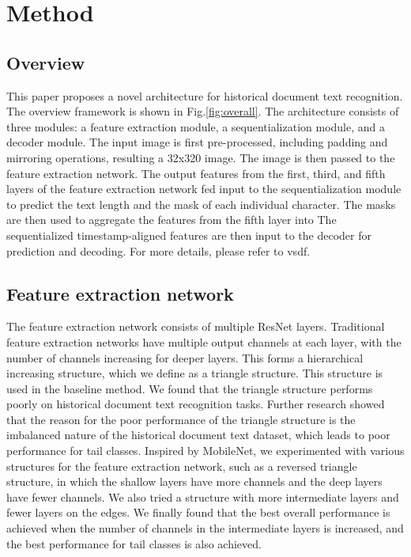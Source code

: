 \section{Method}

\subsection{Overview}
 

This paper proposes a novel architecture for historical document text recognition. The overview framework is shown in Fig.\ref{fig:overall}. The architecture consists of three modules: a feature extraction module, a sequentialization module, and a decoder module. The input image is first pre-processed, including padding and mirroring operations, resulting a 32x320 image. 
The image is then passed to the feature extraction network. The output features from the first, third, and fifth layers of the feature extraction network fed input to the sequentialization module to predict the text length and the mask of each individual character. The masks are then used to aggregate the features from the fifth layer into 
The sequentialized timestamp-aligned features are then input to the decoder for prediction and decoding. For more details, please refer to vsdf\cite{vsdf}.

\subsection{Feature extraction network}

The feature extraction network consists of multiple ResNet layers. Traditional feature extraction networks have multiple output channels at each layer, with the number of channels increasing for deeper layers. This forms a hierarchical increasing structure, which we define as a triangle structure. This structure is used in the baseline method. We found that the triangle structure performs poorly on historical document text recognition tasks. Further research showed that the reason for the poor performance of the triangle structure is the imbalanced nature of the historical document text dataset, which leads to poor performance for tail classes. Inspired by MobileNet, we experimented with various structures for the feature extraction network, such as a reversed triangle structure, in which the shallow layers have more channels and the deep layers have fewer channels. We also tried a structure with more intermediate layers and fewer layers on the edges. We finally found that the best overall performance is achieved when the number of channels in the intermediate layers is increased, and the best performance for tail classes is also achieved.


